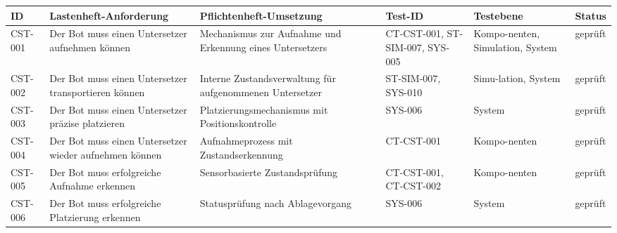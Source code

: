 \begin{longtable}[]{@{}
  >{\raggedright\arraybackslash}p{}
  >{\raggedright\arraybackslash}p{}
  >{\raggedright\arraybackslash}p{}
  >{\raggedright\arraybackslash}p{}
  >{\raggedright\arraybackslash}p{}
  >{\raggedright\arraybackslash}p{}@{}}
\toprule\noalign{}
\begin{minipage}[b]{\linewidth}\raggedright
ID
\end{minipage} & \begin{minipage}[b]{\linewidth}\raggedright
Lastenheft-Anforderung
\end{minipage} & \begin{minipage}[b]{\linewidth}\raggedright
Pflichtenheft-Umsetzung
\end{minipage} & \begin{minipage}[b]{\linewidth}\raggedright
Test-ID
\end{minipage} & \begin{minipage}[b]{\linewidth}\raggedright
Testebene
\end{minipage} & \begin{minipage}[b]{\linewidth}\raggedright
Status
\end{minipage} \\
\midrule\noalign{}
\endhead
\bottomrule\noalign{}
\endlastfoot
CST-001 & Der Bot muss einen Untersetzer aufnehmen können & Mechanismus
zur Aufnahme und Erkennung eines Untersetzers & CT-CST-001, ST-SIM-007,
SYS-005 & Kompo-nenten, Simulation, System & geprüft \\
CST-002 & Der Bot muss einen Untersetzer transportieren können & Interne
Zustandsverwaltung für aufgenommenen Untersetzer & ST-SIM-007, SYS-010 &
Simu-lation, System & geprüft \\
CST-003 & Der Bot muss einen Untersetzer präzise platzieren &
Platzierungsmechanismus mit Positionskontrolle & SYS-006 & System &
geprüft \\
CST-004 & Der Bot muss einen Untersetzer wieder aufnehmen können &
Aufnahmeprozess mit Zustandserkennung & CT-CST-001 & Kompo-nenten &
geprüft \\
CST-005 & Der Bot muss erfolgreiche Aufnahme erkennen & Sensorbasierte
Zustandsprüfung & CT-CST-001, CT-CST-002 & Kompo-nenten & geprüft \\
CST-006 & Der Bot muss erfolgreiche Platzierung erkennen & Statusprüfung
nach Ablagevorgang & SYS-006 & System & geprüft \\
\end{longtable}

